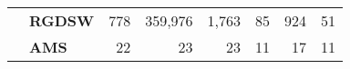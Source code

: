 \begin{table}[H]
\begin{tabular}{llrrrrrr}
\cline{2-8}
\bfseries  & \bfseries RGDSW & 778 & {\cellcolor[HTML]{E2E4FB}} \color[HTML]{000000} 359,976 & {\cellcolor[HTML]{ACB8F4}} \color[HTML]{000000} 1,763 & {\cellcolor[HTML]{768BEC}} \color[HTML]{F1F1F1} 85 & {\cellcolor[HTML]{405FE5}} \color[HTML]{F1F1F1} 924 & 51 \\
\cline{2-8}
\bfseries  & \bfseries AMS & 22 & {\cellcolor[HTML]{405FE5}} \color[HTML]{F1F1F1} 23 & {\cellcolor[HTML]{405FE5}} \color[HTML]{F1F1F1} 23 & {\cellcolor[HTML]{E2E4FB}} \color[HTML]{000000} 11 & {\cellcolor[HTML]{91A1F0}} \color[HTML]{F1F1F1} 17 & 11 \\
\cline{1-8} \cline{2-8}
\bottomrule
\end{tabular}
\end{table}
